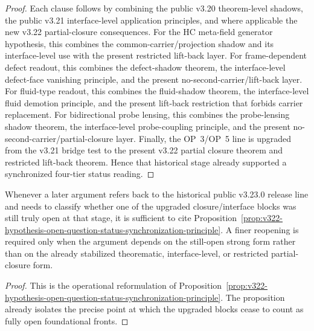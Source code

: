 \begin{proof}
Each clause follows by combining the public v3.20 theorem-level shadows, the public v3.21 interface-level application principles, and where applicable the new v3.22 partial-closure consequences. For the HC meta-field generator hypothesis, this combines the common-carrier/projection shadow and its interface-level use with the present restricted lift-back layer. For frame-dependent defect readout, this combines the defect-shadow theorem, the interface-level defect-face vanishing principle, and the present no-second-carrier/lift-back layer. For fluid-type readout, this combines the fluid-shadow theorem, the interface-level fluid demotion principle, and the present lift-back restriction that forbids carrier replacement. For bidirectional probe lensing, this combines the probe-lensing shadow theorem, the interface-level probe-coupling principle, and the present no-second-carrier/partial-closure layer. Finally, the OP~3/OP~5 line is upgraded from the v3.21 bridge test to the present v3.22 partial closure theorem and restricted lift-back theorem. Hence that historical stage already supported a synchronized four-tier status reading.
\end{proof}

\begin{corollary}
\label{cor:use-rule-for-the-synchronized-v322-status-reading}
Whenever a later argument refers back to the historical public v3.23.0 release line and needs to classify whether one of the upgraded closure/interface blocks was still truly open at that stage, it is sufficient to cite Proposition~\ref{prop:v322-hypothesis-open-question-status-synchronization-principle}. A finer reopening is required only when the argument depends on the still-open strong form rather than on the already stabilized theorematic, interface-level, or restricted partial-closure form.
\end{corollary}

\begin{proof}
This is the operational reformulation of Proposition~\ref{prop:v322-hypothesis-open-question-status-synchronization-principle}. The proposition already isolates the precise point at which the upgraded blocks cease to count as fully open foundational fronts.
\end{proof}


